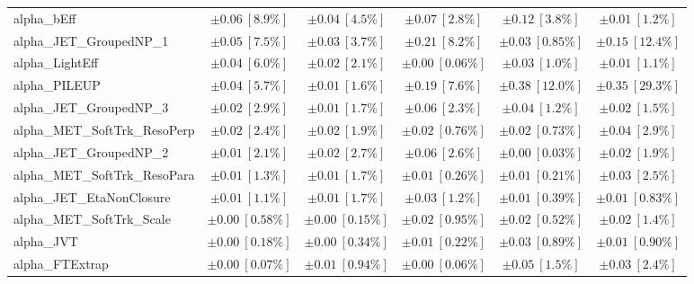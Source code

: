 \begin{sidewaystable}
\begin{center}
\begin{tabular*}{\textwidth}{@{\extracolsep{\fill}}lccccc}
alpha\_bEff         & $\pm 0.06\ [8.9\%] $          & $\pm 0.04\ [4.5\%] $          & $\pm 0.07\ [2.8\%] $          & $\pm 0.12\ [3.8\%] $          & $\pm 0.01\ [1.2\%] $       \\
alpha\_JET\_GroupedNP\_1         & $\pm 0.05\ [7.5\%] $          & $\pm 0.03\ [3.7\%] $          & $\pm 0.21\ [8.2\%] $          & $\pm 0.03\ [0.85\%] $          & $\pm 0.15\ [12.4\%] $       \\
alpha\_LightEff         & $\pm 0.04\ [6.0\%] $          & $\pm 0.02\ [2.1\%] $          & $\pm 0.00\ [0.06\%] $          & $\pm 0.03\ [1.0\%] $          & $\pm 0.01\ [1.1\%] $       \\
alpha\_PILEUP         & $\pm 0.04\ [5.7\%] $          & $\pm 0.01\ [1.6\%] $          & $\pm 0.19\ [7.6\%] $          & $\pm 0.38\ [12.0\%] $          & $\pm 0.35\ [29.3\%] $       \\
alpha\_JET\_GroupedNP\_3         & $\pm 0.02\ [2.9\%] $          & $\pm 0.01\ [1.7\%] $          & $\pm 0.06\ [2.3\%] $          & $\pm 0.04\ [1.2\%] $          & $\pm 0.02\ [1.5\%] $       \\
alpha\_MET\_SoftTrk\_ResoPerp         & $\pm 0.02\ [2.4\%] $          & $\pm 0.02\ [1.9\%] $          & $\pm 0.02\ [0.76\%] $          & $\pm 0.02\ [0.73\%] $          & $\pm 0.04\ [2.9\%] $       \\
alpha\_JET\_GroupedNP\_2         & $\pm 0.01\ [2.1\%] $          & $\pm 0.02\ [2.7\%] $          & $\pm 0.06\ [2.6\%] $          & $\pm 0.00\ [0.03\%] $          & $\pm 0.02\ [1.9\%] $       \\
alpha\_MET\_SoftTrk\_ResoPara         & $\pm 0.01\ [1.3\%] $          & $\pm 0.01\ [1.7\%] $          & $\pm 0.01\ [0.26\%] $          & $\pm 0.01\ [0.21\%] $          & $\pm 0.03\ [2.5\%] $       \\
alpha\_JET\_EtaNonClosure         & $\pm 0.01\ [1.1\%] $          & $\pm 0.01\ [1.7\%] $          & $\pm 0.03\ [1.2\%] $          & $\pm 0.01\ [0.39\%] $          & $\pm 0.01\ [0.83\%] $       \\
alpha\_MET\_SoftTrk\_Scale         & $\pm 0.00\ [0.58\%] $          & $\pm 0.00\ [0.15\%] $          & $\pm 0.02\ [0.95\%] $          & $\pm 0.02\ [0.52\%] $          & $\pm 0.02\ [1.4\%] $       \\
alpha\_JVT         & $\pm 0.00\ [0.18\%] $          & $\pm 0.00\ [0.34\%] $          & $\pm 0.01\ [0.22\%] $          & $\pm 0.03\ [0.89\%] $          & $\pm 0.01\ [0.90\%] $       \\
alpha\_FTExtrap         & $\pm 0.00\ [0.07\%] $          & $\pm 0.01\ [0.94\%] $          & $\pm 0.00\ [0.06\%] $          & $\pm 0.05\ [1.5\%] $          & $\pm 0.03\ [2.4\%] $       \\

\end{tabular*}
\end{center}
\end{sidewaystable}

